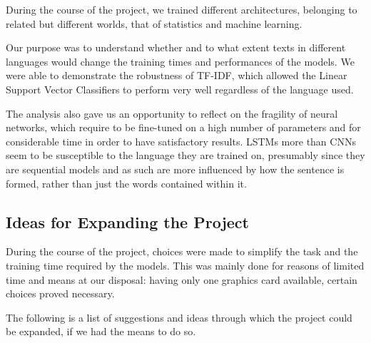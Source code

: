 \documentclass[letterpaper,11pt]{article}
\begin{document}
During the course of the project, we trained different architectures, belonging to related but different worlds, that of statistics and machine learning.

Our purpose was to understand whether and to what extent texts in different languages would change the training times and performances of the models. We were able to demonstrate the robustness of TF-IDF, which allowed the Linear Support Vector Classifiers to perform very well regardless of the language used.

The analysis also gave us an opportunity to reflect on the fragility of neural networks, which require to be fine-tuned on a high number of parameters and for considerable time in order to have satisfactory results. LSTMs more than CNNs seem to be susceptible to the language they are trained on, presumably since they are sequential models and as such are more influenced by how the sentence is formed, rather than just the words contained within it.

\subsection{Ideas for Expanding the Project}

During the course of the project, choices were made to simplify the task and the training time required by the models. This was mainly done for reasons of limited time and means at our disposal: having only one graphics card available, certain choices proved necessary.

The following is a list of suggestions and ideas through which the project could be expanded, if we had the means to do so.
\end{document}

